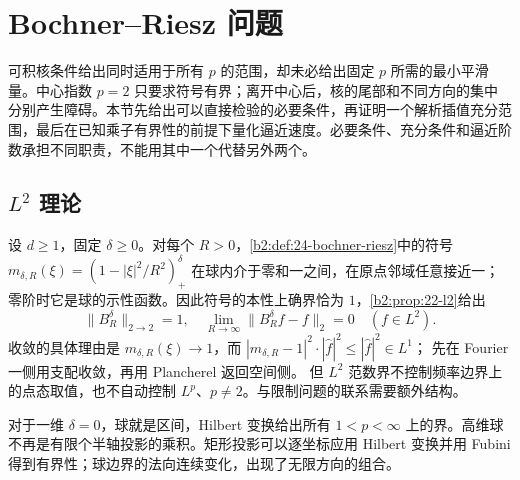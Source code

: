 \section{Bochner–Riesz 问题}
\label{b2:sec:2403}

可积核条件给出同时适用于所有 \(p\) 的范围，却未必给出固定 \(p\) 所需的最小平滑量。中心指数 \(p=2\) 只要求符号有界；离开中心后，核的尾部和不同方向的集中分别产生障碍。本节先给出可以直接检验的必要条件，再证明一个解析插值充分范围，最后在已知乘子有界性的前提下量化逼近速度。必要条件、充分条件和逼近阶数承担不同职责，不能用其中一个代替另外两个。

\subsection{\texorpdfstring{\(L^2\)}{L2} 理论}
\label{b2:subsec:240301}

设 \(d\geq1\)，固定 \(\delta\geq0\)。对每个 \(R>0\)，\cref{b2:def:24-bochner-riesz}中的符号
\(m_{\delta,R}(\xi)=(1-|\xi|^2/R^2)_+^\delta\)
在球内介于零和一之间，在原点邻域任意接近一；零阶时它是球的示性函数。因此符号的本性上确界恰为 \(1\)，\cref{b2:prop:22-l2}给出
\[
 \|B_R^\delta\|_{2\to2}=1,\quad
 \lim_{R\to\infty}\|B_R^\delta f-f\|_2=0
 \quad(f\in L^2).
\]
收敛的具体理由是 \(m_{\delta,R}(\xi)\to1\)，而
\(|m_{\delta,R}-1|^2\cdot|\widehat f|^2\leq|\widehat f|^2\in L^1\)；
先在 Fourier 一侧用支配收敛，再用 Plancherel 返回空间侧。
但 \(L^2\) 范数界不控制频率边界上的点态取值，也不自动控制 \(L^p\)、\(p\ne2\)。与限制问题的联系需要额外结构。

\ProseParagraphBreak
对于一维 \(\delta=0\)，球就是区间，Hilbert 变换给出所有 \(1<p<\infty\) 上的界。高维球不再是有限个半轴投影的乘积。矩形投影可以逐坐标应用 Hilbert 变换并用 Fubini 得到有界性；球边界的法向连续变化，出现了无限方向的组合。

